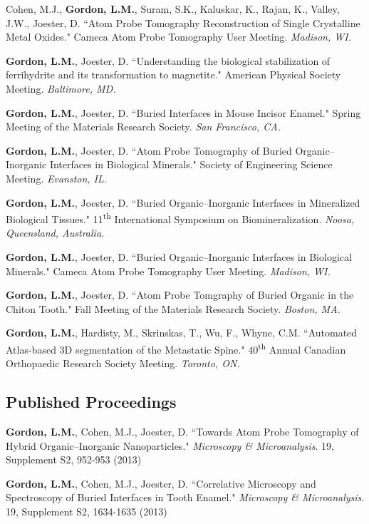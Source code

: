 Cohen, M.J., \textbf{Gordon, L.M.}, Suram, S.K., Kaluskar, K., Rajan, K., Valley, J.W., Joester, D. ``Atom Probe Tomography Reconstruction of Single Crystalline Metal Oxides." Cameca Atom Probe Tomography User Meeting. \emph{Madison, WI.}

\textbf{Gordon, L.M.}, Joester, D. ``Understanding the biological stabilization of ferrihydrite and its transformation to magnetite." American Physical Society Meeting. \emph{Baltimore, MD.}

\textbf{Gordon, L.M.}, Joester, D. ``Buried Interfaces in Mouse Incisor Enamel." Spring Meeting of the Materials Research Society. \emph{San Francisco, CA.}

\textbf{Gordon, L.M.}, Joester, D. ``Atom Probe Tomography of Buried Organic--Inorganic Interfaces in Biological Minerals." Society of Engineering Science Meeting. \emph{Evanston, IL.}

\textbf{Gordon, L.M.}, Joester, D. ``Buried Organic--Inorganic Interfaces in Mineralized Biological Tissues." 11\textsuperscript{th} International Symposium on Biomineralization. \emph{Noosa, Queensland, Australia.}

\textbf{Gordon, L.M.}, Joester, D. ``Buried Organic--Inorganic Interfaces in Biological Minerals." Cameca Atom Probe Tomography User Meeting. \emph{Madison, WI.}

\textbf{Gordon, L.M.}, Joester, D. ``Atom Probe Tomgraphy of Buried Organic in the Chiton Tooth." Fall Meeting of the Materials Research Society. \emph{Boston, MA.}

\textbf{Gordon, L.M.}, Hardisty, M., Skrinskas, T., Wu, F., Whyne, C.M. ``Automated Atlas-based 3D segmentation of the Metastatic Spine." 40\textsuperscript{th} Annual Canadian Orthopaedic Research Society Meeting. \emph{Toronto, ON.}
\endgroup

\subsection*{Published Proceedings}
\textbf{Gordon, L.M.}, Cohen, M.J., Joester, D. ``Towards Atom Probe Tomography of Hybrid Organic--Inorganic Nanoparticles." \emph{Microscopy \& Microanalysis}. 19, Supplement S2, 952-953 (2013)
\begingroup\setlength{\parskip}{0.15cm}

\textbf{Gordon, L.M.}, Cohen, M.J., Joester, D. ``Correlative Microscopy and Spectroscopy of Buried Interfaces in Tooth Enamel." \emph{Microscopy \& Microanalysis}. 19, Supplement S2, 1634-1635 (2013)

